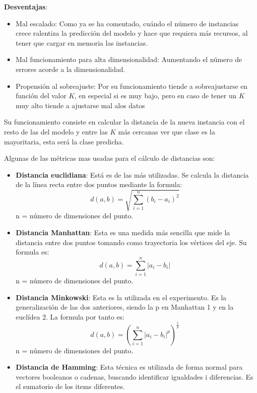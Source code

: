 \textbf{Desventajas}:

\begin{itemize}
	\item{Mal escalado}: Como ya se ha comentado, cuándo el número de instancias crece ralentiza la predicción del modelo y hace que requiera más recursos, al tener que cargar en memoria las instancias.
	
	\item{Mal funcionamiento para alta dimensionalidad}: Aumentando el número de errores acorde a la dimensionalidad.
	
	\item{Propensión al sobreajuste}: Por su funcionamiento tiende a sobreajustarse en función del valor $K$, en especial si es muy bajo, pero en caso de tener un $K$ muy alto tiende a ajustarse mal alos datos 
	
\end{itemize}

Su funcionamiento consiste en calcular la distancia de la nueva instancia con el resto de las del modelo y entre las $K$ más cercanas ver que clase es la mayoritaria, esta será la clase predicha.

Algunas de las métricas mas usadas para el cálculo de distancias son:

\begin{itemize}
	\item\textbf{Distancia euclidiana}: Está es de las más utilizadas. Se calcula la distancia de la línea recta entre dos puntos mediante la formula:
	\begin{equation}
		d(a,b)=\sqrt{\sum_{i=1}^{n}(b_{i}-a_{i})^{2}}
	\end{equation}
	n = número de dimensiones del punto.
	
	\item\textbf{Distancia Manhattan}: Esta es una medida más sencilla que mide la distancia entre dos puntos tomando  como trayectoria los vértices del eje. Su formula es:
	\begin{equation}
		d(a,b)=\sum_{i=1}^{n}|a_{i}-b_{i}|
	\end{equation}
	n = número de dimensiones del punto.
	
	\item\textbf{Distancia Minkowski}: Esta es la utilizada en el experimento. Es la generalización de las dos anteriores, siendo la p en Manhattan  1 y en la euclídea 2. La formula por tanto es:
	\begin{equation}
		d(a,b)=(\sum_{i=1}^{n}|a_{i}-b_{i}|^p)^{\frac{1}{p}}
	\end{equation}
	n = número de dimensiones del punto.
	
	\item\textbf{Distancia de Hamming}:  Esta técnica es utilizada de forma normal para vectores booleanos o cadenas, buscando identificar igualdades i diferencias. Es el sumatorio de los items diferentes.
	
\end{itemize}

